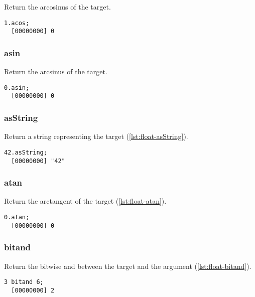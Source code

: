 Return the arcosinus of the target.

\begin{lstlisting}[caption=Float.acos, label=lst:float-acos,
  float=\floatposh]
  1.acos;
  [00000000] 0
\end{lstlisting}

\subsubsection{asin}

Return the arcsinus of the target.

\begin{lstlisting}[caption=Float.asin, label=lst:float-asin,
  float=\floatposh]
  0.asin;
  [00000000] 0
\end{lstlisting}

\subsubsection{asString}

Return a string representing the target (\autoref{lst:float-asString}).

\begin{lstlisting}[caption=Float.asString, label=lst:float-asString,
  float=\floatposh]
  42.asString;
  [00000000] "42"
\end{lstlisting}

\subsubsection{atan}

Return the arctangent of the target (\autoref{lst:float-atan}).

\begin{lstlisting}[caption=Float.atan, label=lst:float-atan,
  float=\floatposh]
  0.atan;
  [00000000] 0
\end{lstlisting}

\subsubsection{bitand}

Return the bitwise and between the target and the argument (\autoref{lst:float-bitand}).

\begin{lstlisting}[caption=Float.bitand, label=lst:float-bitand,
  float=\floatposh]
  3 bitand 6;
  [00000000] 2
\end{lstlisting}

